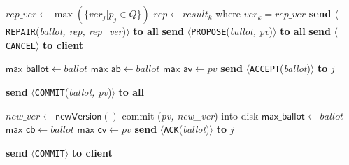 \begin{algorithm*}
\begin{multicols}{2}
\begin{algorithmic}[1]
                \State $rep\_ver\gets \max(\{ver_j|p_j\in Q\})$\;
                \State $rep\gets result_k$ where $ver_k = rep\_ver$\;
                    \State \textbf{send} $\langle$\texttt{REPAIR}(\textit{ballot, rep, rep\_ver})$\rangle$ \textbf{to all}\;
                \EndIf
                 \label{alg-c-lwt-line:pc}
                    \State \textbf{send} $\langle$\texttt{PROPOSE}(\textit{ballot, pv})$\rangle$ \textbf{to all}\; \label{alg-c-lwt-line:pc2}
                    \Else
                    \State \textbf{send} $\langle$\texttt{CANCEL}$\rangle$ \textbf{to client}
                \EndIf
            \EndIf
        \ENDRQ
        \columnbreak

                \State $\mathsf{max\_ballot}\gets ballot$\;
                \State $\mathsf{max\_ab}\gets ballot$\;
                \State $\mathsf{max\_av}\gets pv$\;
                \State \textbf{send} $\langle$\texttt{ACCEPT}(\textit{ballot})$\rangle$ \textbf{to} $j$
            \EndIf
        \ENDR

            \State \textbf{send} $\langle$\texttt{COMMIT}(\textit{ballot, pv})$\rangle$ \textbf{to all}
        \ENDRQ

                \State $new\_ver \gets \mathsf{newVersion()}$\;
                \State commit (\textit{pv, new\_ver}) into disk\;
                \State $\mathsf{max\_ballot}\gets ballot$\;
                \State $\mathsf{max\_cb}\gets ballot$\;
                \State $\mathsf{max\_cv}\gets pv$\;
                \State \textbf{send} $\langle$\texttt{ACK}(\textit{ballot})$\rangle$ \textbf{to} $j$\;
            \EndIf
        \ENDR

            \State \textbf{send} $\langle$\texttt{COMMIT}$\rangle$ \textbf{to client}
        \ENDRQ
        \end{algorithmic}
    \end{multicols}
\end{algorithm*}